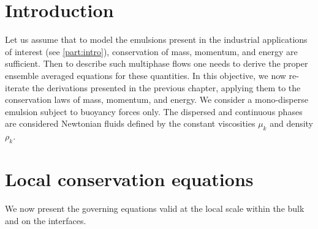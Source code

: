 \section{Introduction}
\label{ap:hypothesis}
Let us assume that to model the emulsions present in the industrial applications of interest (see \ref{part:intro}), conservation of mass, momentum, and energy are sufficient. 
Then to describe such multiphase flows one needs to derive the proper ensemble averaged equations for these quantities.
In this objective, we now re-iterate the derivations presented in the previous chapter, applying them to the conservation laws of mass, momentum, and energy. 
We consider a mono-disperse emulsion subject to buoyancy forces only. 
The dispersed and continuous phases are considered Newtonian fluids defined by the constant viscosities $\mu_k$ and density $\rho_k$.

\section{Local conservation equations}
\label{sec:chap2local}
We now present the governing equations valid at the local scale within the bulk and on the interfaces. 

